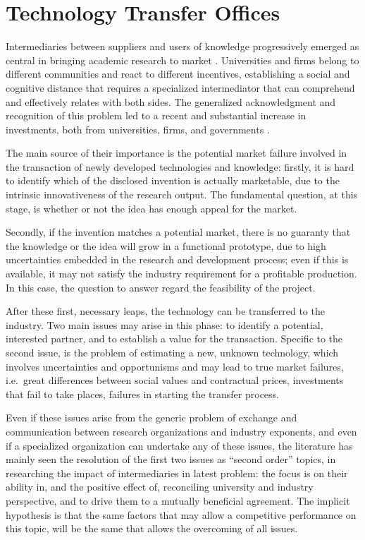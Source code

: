 \section{Technology Transfer Offices}

Intermediaries between suppliers and users of knowledge progressively emerged as central in bringing academic research to market \citep{Landry2013}. Universities and firms belong to different communities and react to different incentives, establishing a social and cognitive distance that requires a specialized intermediator that can comprehend and effectively relates with both sides. The generalized acknowledgment and recognition of this problem led to a recent and substantial increase in investments, both from universities, firms, and governments \citep{Muscio2010}.

The main source of their importance is the potential market failure involved in the transaction of newly developed technologies and knowledge: firstly, it is hard to identify which of the disclosed invention is actually marketable, due to the intrinsic innovativeness of the research output. The fundamental question, at this stage, is whether or not the idea has enough appeal for the market.

Secondly, if the invention matches a potential market, there is no guaranty that the knowledge or the idea will grow in a functional prototype, due to high uncertainties embedded in the research and development process; even if this is available, it may not satisfy the industry requirement for a profitable production. In this case, the question to answer regard the feasibility of the project.

After these first, necessary leaps, the technology can be transferred to the industry. Two main issues may arise in this phase: to identify a potential, interested partner, and to establish a value for the transaction. Specific to the second issue, is the problem of estimating a new, unknown technology, which involves uncertainties and opportunisms and may lead to true market failures, i.e.\ great differences between social values and contractual prices, investments that fail to take places, failures in starting the transfer process.

Even if these issues arise from the generic problem of exchange and communication between research organizations and industry exponents, and even if a specialized organization can undertake any of these issues, the literature has mainly seen the resolution of the first two issues as \enquote{second order} topics, in researching the impact of intermediaries in latest problem: the focus is on their ability in, and the positive effect of, reconciling university and industry perspective, and to drive them to a mutually beneficial agreement. The implicit hypothesis is that the same factors that may allow a competitive performance on this topic, will be the same that allows the overcoming of all issues.

